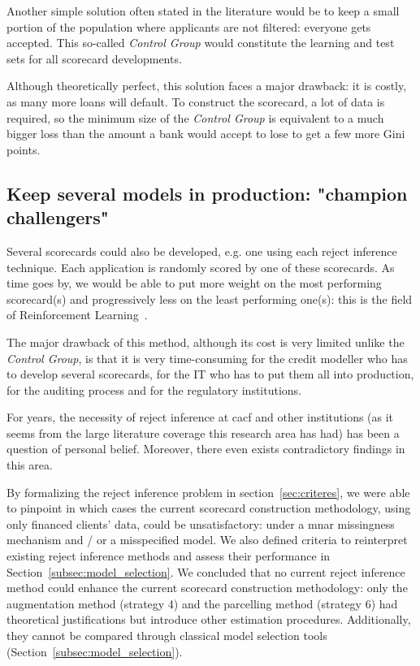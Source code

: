 Another simple solution often stated in the literature would be to keep a small portion of the population where applicants are not filtered: everyone gets accepted. This so-called \textit{Control Group} would constitute the learning and test sets for all scorecard developments.

Although theoretically perfect, this solution faces a major drawback: it is costly, as many more loans will default. To construct the scorecard, a lot of data is required, so the minimum size of the \textit{Control Group} is equivalent to a much bigger loss than the amount a bank would accept to lose to get a few more Gini points.

\subsection{Keep several models in production: "champion challengers"}

Several scorecards could also be developed, e.g. one using each {reject inference} technique. Each application is randomly scored by one of these scorecards. As time goes by, we would be able to put more weight on the most performing scorecard(s) and progressively less on the least performing one(s): this is the field of Reinforcement Learning~\cite{Sutton1998}.

The major drawback of this method, although its cost is very limited unlike the \textit{Control Group}, is that it is very time-consuming for the credit modeller who has to develop several scorecards, for the IT who has to put them all into production, for the auditing process and for the regulatory institutions.

\bigskip

For years, the necessity of {reject inference} at \gls{cacf} and other institutions (as it seems from the large literature coverage this research area has had) has been a question of personal belief. Moreover, there even exists contradictory findings in this area.

By formalizing the {reject inference} problem in section~\ref{sec:criteres}, we were able to pinpoint in which cases the current scorecard construction methodology, using only financed clients' data, could be unsatisfactory: under a \gls{mnar} missingness mechanism and / or a misspecified model. We also defined criteria to reinterpret existing {reject inference} methods and assess their performance in Section~\ref{subsec:model_selection}. We concluded that no current {reject inference} method could enhance the current scorecard construction methodology: only the augmentation method (strategy 4) and the parcelling method (strategy 6) had theoretical justifications but introduce other estimation procedures. Additionally, they cannot be compared through classical model selection tools (Section~\ref{subsec:model_selection}).


